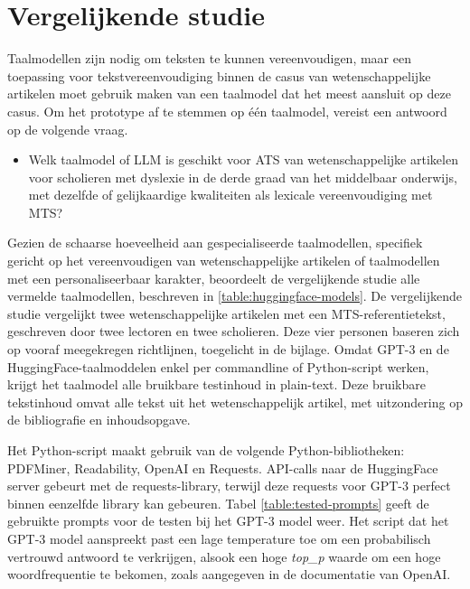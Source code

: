 \section{Vergelijkende studie}
\label{sec:vergelijkende-studie}

Taalmodellen zijn nodig om teksten te kunnen vereenvoudigen, maar een toepassing voor tekstvereenvoudiging binnen de casus van wetenschappelijke artikelen moet gebruik maken van een taalmodel dat het meest aansluit op deze casus. Om het prototype af te stemmen op één taalmodel, vereist een antwoord op de volgende vraag. 

\begin{itemize}
	\item Welk taalmodel of LLM is geschikt voor ATS van wetenschappelijke artikelen voor scholieren met dyslexie in de derde graad van het middelbaar onderwijs, met dezelfde of gelijkaardige kwaliteiten als lexicale vereenvoudiging met MTS?
\end{itemize}


Gezien de schaarse hoeveelheid aan gespecialiseerde taalmodellen, specifiek gericht op het vereenvoudigen van wetenschappelijke artikelen of taalmodellen met een personaliseerbaar karakter, beoordeelt de vergelijkende studie alle vermelde taalmodellen, beschreven in \ref{table:huggingface-models}. 
De vergelijkende studie vergelijkt twee wetenschappelijke artikelen met een MTS-referentietekst, geschreven door twee lectoren en twee scholieren. Deze vier personen baseren zich op vooraf meegekregen richtlijnen, toegelicht in de bijlage. Omdat GPT-3 en de HuggingFace-taalmoddelen enkel per commandline of Python-script werken, krijgt het taalmodel alle bruikbare testinhoud in plain-text. Deze bruikbare tekstinhoud omvat alle tekst uit het wetenschappelijk artikel, met uitzondering op de bibliografie en inhoudsopgave.

\medspace

Het Python-script maakt gebruik van de volgende Python-bibliotheken: PDFMiner, Readability, OpenAI en Requests. API-calls naar de HuggingFace server gebeurt met de requests-library, terwijl deze requests voor GPT-3 perfect binnen eenzelfde library kan gebeuren. Tabel \ref{table:tested-prompts} geeft de gebruikte prompts voor de testen bij het GPT-3 model weer. Het script dat het GPT-3 model aanspreekt past een lage temperature toe om een probabilisch vertrouwd antwoord te verkrijgen, alsook een hoge \textit{top\_p} waarde om een hoge woordfrequentie te bekomen, zoals aangegeven in de documentatie van OpenAI.

